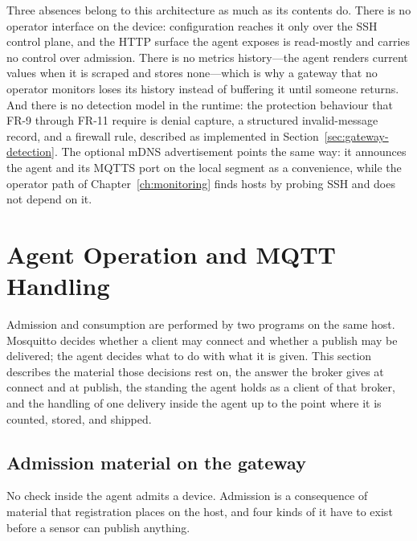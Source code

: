 \documentclass[12pt,a4paper]{report}
\begin{document}
Three absences belong to this architecture as much as its
contents do. There is no operator interface on the device:
configuration reaches it only over the SSH control plane, and the
HTTP surface the agent exposes is read-mostly and carries no
control over admission. There is no metrics history---the agent
renders current values when it is scraped and stores none---which
is why a gateway that no operator monitors loses its history
instead of buffering it until someone returns. And there is no
detection model in the runtime: the protection behaviour that
FR-9 through FR-11 require is denial capture, a structured
invalid-message record, and a firewall rule, described as
implemented in Section~\ref{sec:gateway-detection}. The optional
mDNS advertisement points the same way: it announces the agent and
its MQTTS port on the local segment as a convenience, while the
operator path of Chapter~\ref{ch:monitoring} finds hosts by
probing SSH and does not depend on it.

\section{Agent Operation and MQTT Handling}
\label{sec:gateway-agent}

Admission and consumption are performed by two programs on the same
host. Mosquitto decides whether a client may connect and whether a
publish may be delivered; the agent decides what to do with what it
is given. This section describes the material those decisions rest
on, the answer the broker gives at connect and at publish, the
standing the agent holds as a client of that broker, and the
handling of one delivery inside the agent up to the point where it
is counted, stored, and shipped.

\subsection{Admission material on the gateway}
\label{sec:gw-admission}

No check inside the agent admits a device. Admission is a
consequence of material that registration places on the host, and
four kinds of it have to exist before a sensor can publish anything.
\end{document}
